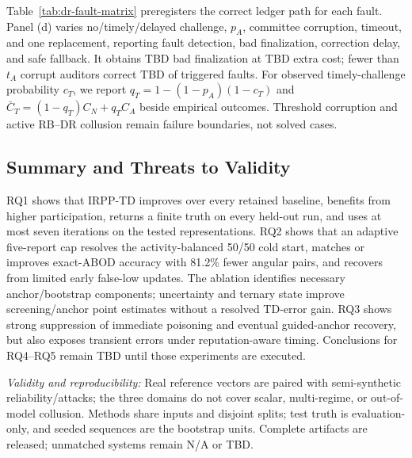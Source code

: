 \documentclass[journal]{IEEEtran}
\newcommand{\tbd}{\textcolor{tbdblue}{\textsf{TBD}}}
\begin{document}
Table~\ref{tab:dr-fault-matrix} preregisters the correct ledger path for each
fault. Panel (d) varies no/timely/delayed challenge, \(p_A\), committee
corruption, timeout, and one replacement, reporting fault detection, bad
finalization, correction delay, and safe fallback. It obtains \tbd{} bad
finalization at \tbd{} extra cost; fewer than \(t_A\) corrupt auditors correct
\tbd{} of triggered faults. For observed timely-challenge probability \(c_T\),
we report \(q_T=1-(1-p_A)(1-c_T)\) and
\(\bar C_T=(1-q_T)C_N+q_TC_A\) beside empirical outcomes. Threshold corruption
and active RB--DR collusion remain failure boundaries, not solved cases.

\subsection{Summary and Threats to Validity}
\label{sec:experiment-summary}

RQ1 shows that IRPP-TD improves over every retained baseline, benefits from
higher participation, returns a finite truth on every held-out run, and uses at
most seven iterations on the tested representations. RQ2 shows that an adaptive
five-report cap resolves the activity-balanced 50/50 cold start, matches or
improves exact-ABOD accuracy with 81.2\% fewer angular pairs, and recovers from
limited early false-low updates. The ablation identifies necessary
anchor/bootstrap components; uncertainty and ternary state improve
screening/anchor point estimates without a resolved TD-error gain. RQ3 shows
strong suppression of immediate poisoning and eventual guided-anchor recovery,
but also exposes transient errors under reputation-aware timing. Conclusions
for RQ4--RQ5 remain \tbd{} until those experiments are executed.

\textit{Validity and reproducibility:}
Real reference vectors are paired with semi-synthetic reliability/attacks; the
three domains do not cover scalar, multi-regime, or out-of-model collusion.
Methods share inputs and disjoint splits; test truth is evaluation-only, and
seeded sequences are the bootstrap units. Complete artifacts are released;
unmatched systems remain N/A or \tbd{}.
\end{document}
